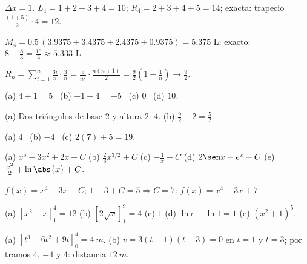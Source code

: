 \documentclass[11pt,a4paper]{article}
\begin{document}
\respuestas
\begin{respuestascortas}
\begin{soluciones}
\item $\Delta x=1$. $L_4=1+2+3+4=10$; $R_4=2+3+4+5=14$; exacta: trapecio $\frac{(1+5)}{2}\cdot4=12$.
\item $M_4=0.5\,(3.9375+3.4375+2.4375+0.9375)=5.375$ L; exacto: $8-\frac83=\frac{16}{3}\approx5.333$ L.
\item $R_n=\sum_{i=1}^{n}\frac{3i}{n}\cdot\frac3n=\frac{9}{n^{2}}\cdot\frac{n(n+1)}{2}=\frac92\left(1+\frac1n\right)\to\frac92$.
\item (a) $4+1=5$ \ (b) $-1-4=-5$ \ (c) $0$ \ (d) $10$.
\item (a) Dos triángulos de base $2$ y altura $2$: $4$. (b) $\frac92-2=\frac52$.
\item (a) $4$ \ (b) $-4$ \ (c) $2(7)+5=19$.
\item (a) $x^{5}-3x^{2}+2x+C$ (b) $\frac23x^{3/2}+C$ (c) $-\frac1x+C$ (d) $2\sen x-e^{x}+C$ (e) $\frac{x^{2}}{2}+\ln\abs{x}+C$.
\item $f(x)=x^{4}-3x+C$; $1-3+C=5\Rightarrow C=7$: $f(x)=x^{4}-3x+7$.
\item (a) $\left[x^{2}-x\right]_1^4=12$ (b) $\left[2\sqrt x\right]_1^9=4$ (c) $1$ (d) $\ln e-\ln1=1$ (e) $(x^{2}+1)^{5}$.
\item (a) $\left[t^{3}-6t^{2}+9t\right]_0^4=\SI{4}{m}$. (b) $v=3(t-1)(t-3)=0$ en $t=1$ y $t=3$; por tramos
  $4$, $-4$ y $4$: distancia $\SI{12}{m}$.
\end{soluciones}
\end{respuestascortas}
\end{document}
